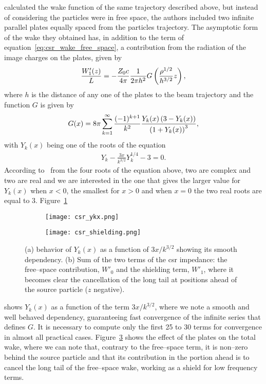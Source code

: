      calculated the wake function of the same trajectory described above, but instead of considering the particles were in free space, the authors included two infinite parallel plates equally spaced from the particles trajectory. The asymptotic form of the wake they obtained has, in addition to the term of equation~\eqref{eq:csr_wake_free_space}, a contribution from the radiation of the image charges on the plates, given by
    \begin{align}\label{eq:csr_wake_shielding}
        \frac{W'_1(z)}{L} = -\frac{Z_0 c}{4\pi}\frac{1}{2\pi h^2} G\left(\frac{\rho^{1/2}}{h^{3/2}}z\right),
    \end{align}
    where $h$ is the distance of any one of the plates to the beam trajectory and the function $G$ is given by
    \begin{align}
        G(x) = 8\pi\sum_{k=1}^\infty \frac{(-1)^{k+1}}{k^2}\frac{Y_k(x)\left(3-Y_k(x)\right)}{\left(1+Y_k(x)\right)^3},
    \end{align}
    with $Y_k(x)$ being one of the roots of the equation
    \begin{align}
        Y_k - \frac{3x}{k^{3/2}}Y_k^{1/4} - 3 = 0.
    \end{align}
    According to~ from the four roots of the equation above, two are complex and two are real and we are interested in the one that gives the larger value for $Y_k(x)$ when $x<0$, the smallest for $x>0$ and when $x=0$ the two real roots are equal to 3. Figure~\ref{fig:csr_ykx}
    \begin{figure}
        \centering
        \begin{subfigure}[c]{0.48\textwidth}
            \centering
            \texttt{[image: csr\_ykx.png]}
            \caption{}
            \label{fig:csr_ykx}
        \end{subfigure}\hfill
        \begin{subfigure}[c]{0.48\textwidth}
            \centering
            \texttt{[image: csr\_shielding.png]}
            \caption{}
            \label{fig:csr_shielding}
        \end{subfigure}
        \caption[Intermediary results from the CSR impedance calculation.]{(a) behavior of $Y_k(x)$ as a function of $3x/k^{3/2}$ showing its smooth dependency. (b) Sum of the two terms of the \gls{csr} impedance: the free--space contribution, $W'_0$ and the shielding term, $W'_1$, where it becomes clear the cancellation of the long tail at positions ahead of the source particle ($z$ negative).}
    \end{figure}
    shows $Y_k(x)$ as a function of the term $3x/k^{3/2}$, where we note a smooth and well behaved dependency, guaranteeing fast convergence of the infinite series that defines $G$. It is necessary to compute only the first 25 to 30 terms for convergence in almost all practical cases. Figure~\ref{fig:csr_shielding} shows the effect of the plates on the total wake, where we can note that, contrary to the free--space term, it is non--zero behind the source particle and that its contribution in the portion ahead is to cancel the long tail of the free--space wake, working as a shield for low frequency terms.

